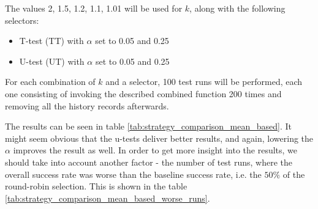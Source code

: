 The values 2, 1.5, 1.2, 1.1, 1.01 will be used for $k$, along with the following selectors:
\begin{itemize}
	\item T-test (TT) with $\alpha$ set to 0.05 and 0.25
	\item U-test (UT) with $\alpha$ set to 0.05 and 0.25
\end{itemize}

For each combination of $k$ and a selector, 100 test runs will be performed, each one consisting of invoking the described combined function 200 times and removing all the history records afterwards.

The results can be seen in table \ref{tab:strategy_comparison_mean_based}. It might seem obvious that the u-tests deliver better results, and again, lowering the $\alpha$ improves the result as well. In order to get more insight into the results, we should take into account another factor - the number of test runs, where the overall success rate was worse than the baseline success rate, i.e. the $50\%$ of the round-robin selection. This is shown in the table \ref{tab:strategy_comparison_mean_based_worse_runs}.

